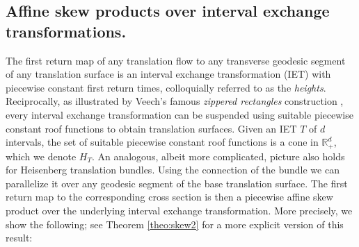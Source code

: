 \documentclass{amsart}
\theoremstyle{definition}
\theoremstyle{remark}
\numberwithin{equation}{section}
\newcommand{\<}{{\langle}}
\renewcommand{\>}{{\rangle}}
\newcommand{\field}[1]{\mathbb{#1}}
\newcommand{\R}{\field{R}}
\newcommand{\Z}{\field{Z}}
\begin{document}
%
\subsection{Affine skew products over interval exchange transformations.}\label{sec:affineskew} The first return map of any translation flow to any transverse geodesic segment of any translation surface is an interval exchange transformation (IET) with piecewise constant first return times, colloquially referred to as the \textit{heights}. Reciprocally, as illustrated by Veech's famous \textit{zippered rectangles} construction \cite{veech}, every interval exchange transformation can be suspended using suitable piecewise constant roof functions to obtain translation surfaces. Given an IET $T$ of $d$ intervals, the set of suitable piecewise constant roof functions is a cone in $\R_+^d$, which we denote $H_T$. An analogous, albeit more complicated, picture also holds for Heisenberg translation bundles. Using the connection of the bundle we can parallelize it over any geodesic segment of the base translation surface. The first return map to the corresponding cross section is then a piecewise affine skew product over the underlying interval exchange transformation. More precisely, we show the following; see Theorem \ref{theo:skew2} for a more explicit version of this result:
\end{document}
